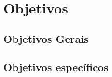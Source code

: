 
\chapter{Objetivos}
\label{cap-objetivos}

\section{Objetivos Gerais}
\label{cap-objetivos gerais}


\section{Objetivos específicos}
\label{cap-objetivos especificos}
